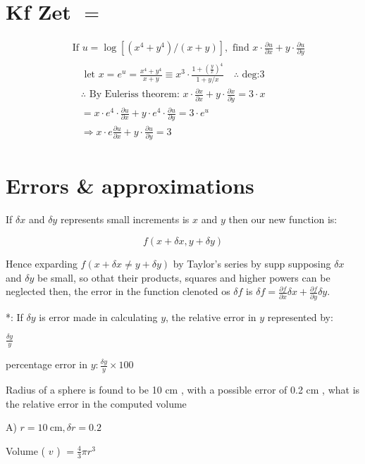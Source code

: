 \documentclass[12pt, a4paper]{article}
\begin{document}
\section*{Kf Zet $=$}
$$
\begin{aligned}
& \text { If } u=\log \left[\left(x^{4}+y^{4}\right) /(x+y)\right], \text { find } x \cdot \frac{\partial u}{\partial x}+y \cdot \frac{\partial u}{\partial y} \\
& \begin{aligned}
& \text { let } x=e^{u}= \frac{x^{4}+y^{4}}{x+y} \equiv x^{3} \cdot \frac{1+\left(\frac{y}{x}\right)^{4}}{1+y / x} \quad \therefore \text { deg:3 } \\
& \therefore \text { By Euleriss theorem: } x \cdot \frac{\partial x}{\partial x}+y \cdot \frac{\partial x}{\partial y}=3 \cdot x \\
&=x \cdot e^{4} \cdot \frac{\partial u}{\partial x}+y \cdot e^{4} \cdot \frac{\partial u}{\partial y}=3 \cdot e^{u} \\
& \Rightarrow x \cdot e \frac{\partial u}{\partial x}+y \cdot \frac{\partial u}{\partial y}=3
\end{aligned}
\end{aligned}
$$

\section*{Errors \& approximations}
If $\delta x$ and $\delta y$ represents small increments is $x$ and $y$ then our new function is:

$$
f(x+\delta x, y+\delta y)
$$

Hence exparding $f(x+\delta x \neq y+\delta y)$ by Taylor's series by supp supposing $\delta x$ and $\delta y$ be small, so othat their products, squares and higher powers can be neglected then, the error in the function clenoted os $\delta f$ is $\delta f=\frac{\partial f}{\partial x} \delta x+\frac{\partial f}{\partial y} \delta y$.

*: If $\delta y$ is error made in calculating $y$, the relative error in $y$ represented by:

$\frac{\delta y}{y}$

percentage error in $y: \frac{\delta y}{y} \times 100$

Radius of a sphere is found to be 10 cm , with a possible error of 0.2 cm , what is the relative error in the computed volume

A) $r=10 \mathrm{~cm}, \delta r=0.2$

Volume ( $v$ ) $=\frac{4}{3} \pi r^{3}$
\end{document}
